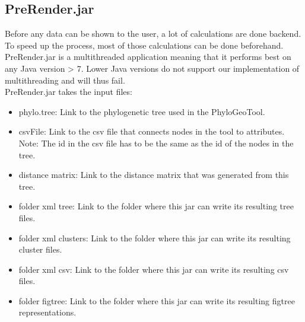 \documentclass[a4paper, 11pt]{article} %
\begin{document}
\subsection{PreRender.jar}
Before any data can be shown to the user, a lot of calculations are done backend. To speed up the process, most of those calculations can be done beforehand.
\\
PreRender.jar is a multithreaded application meaning that it performs best on any Java version > 7. Lower Java versions do not support our implementation of multithreading and will thus fail.
\\
PreRender.jar takes the input files:
\begin{itemize}
\item phylo.tree: Link to the phylogenetic tree used in the PhyloGeoTool.
\item csvFile: Link to the csv file that connects nodes in the tool to attributes. Note: The id in the csv file has to be the same as the id of the nodes in the tree.
\item distance matrix: Link to the distance matrix that was generated from this tree.
\item folder xml tree: Link to the folder where this jar can write its resulting tree files.
\item folder xml clusters: Link to the folder where this jar can write its resulting cluster files.
\item folder xml csv: Link to the folder where this jar can write its resulting csv files.
\item folder figtree: Link to the folder where this jar can write its resulting figtree representations.
\end{itemize}
\end{document}
